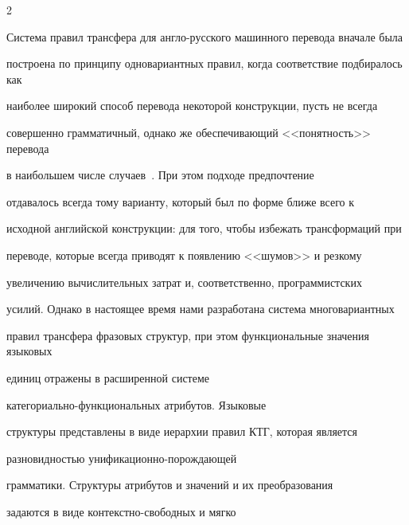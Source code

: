 \begin{multicols}{2}





Система правил трансфера для англо-русского машинного перевода вначале была 


построена по принципу одновариантных правил, когда соответствие подбиралось как 


наиболее широкий способ перевода некоторой конструкции, пусть не всегда 


совершенно грамматичный, однако же обеспе\-чи\-ва\-ющий <<понятность>> перевода 


в наибольшем числе случаев~\cite{10koz}. При этом подходе предпочтение 


отдавалось всегда тому вари\-ан\-ту, который был по форме ближе всего к 


исходной анг\-лий\-ской конструкции: для того, чтобы избежать трансформаций при 


пе\-ре\-во\-де, которые всегда приводят к появлению <<шумов>> и резкому 


увеличению вычислительных затрат и, соот\-вет\-ст\-вен\-но, программистских 


усилий. Одна\-ко в насто\-ящее время нами разработана систе\-ма многовариантных 


правил трансфера фра\-зовых структур, при этом функциональные значения языковых 


единиц отражены в расширенной сис\-те\-ме  


ка\-те\-го\-ри\-аль\-но-функ\-цио\-наль\-ных атрибутов. Языко\-вые 


струк\-ту\-ры представлены в виде иерар\-хии правил КТГ, которая является 


раз\-но\-вид\-ностью уни\-фи\-ка\-ци\-он\-но-по\-рож\-да\-ющей 


грам\-ма\-ти\-ки. Структуры атрибутов и значений и их преобра\-зо\-ва\-ния 


задаются в виде кон\-тек\-с\-т\-но-сво\-бод\-ных и мягко 



\end{multicols}

